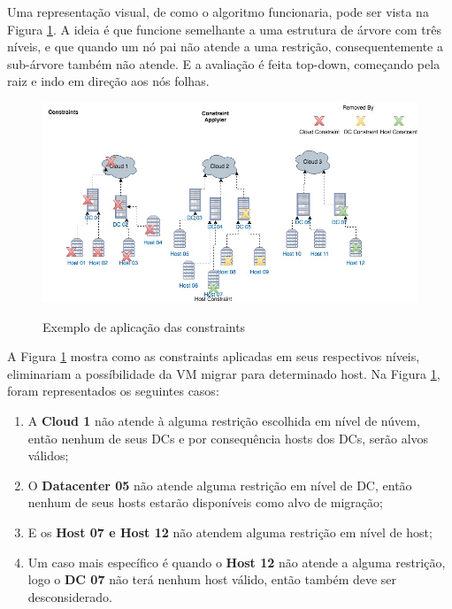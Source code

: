 Uma representação visual, de como o algoritmo funcionaria, pode ser vista na Figura \ref{fig:constraintapplyier}. 
A ideia é que funcione semelhante a uma estrutura de árvore com três níveis, e que quando um nó pai não atende 
a uma restrição, consequentemente a sub-árvore também não atende. E a avaliação é feita top-down, começando pela
raiz e indo em direção aos nós folhas.

\begin{figure}[!htb]
  \centering
  \caption{Exemplo de aplicação das constraints}
  \includegraphics[width=1\textwidth]{./dados/figuras/constraintapplyier}
  \label{fig:constraintapplyier}
\end{figure}

A Figura \ref{fig:constraintapplyier} mostra como as constraints aplicadas em seus respectivos níveis, eliminariam a possíbilidade
da VM migrar para determinado host. Na Figura \ref{fig:constraintapplyier}, foram representados os seguintes casos:

\begin{enumerate}
\item A \textbf{Cloud 1} não atende à alguma restrição escolhida em nível de núvem, então nenhum de seus DCs e por consequência hosts dos DCs, serão alvos válidos;
\item O \textbf{Datacenter 05} não atende alguma restrição em nível de DC, então nenhum de seus hosts estarão disponíveis como alvo de migração;
\item E os \textbf{Host 07 e Host 12} não atendem alguma restrição em nível de host;
\item Um caso mais específico é quando o \textbf{Host 12} não atende a alguma restrição, logo o \textbf{DC 07} não terá nenhum host válido, então também deve ser desconsiderado.
\end{enumerate}

